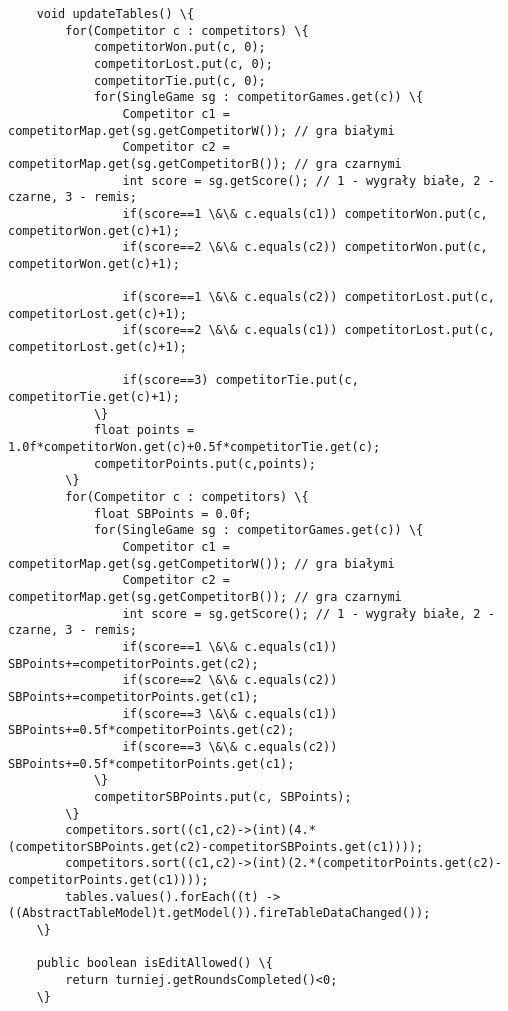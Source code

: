 \begin{verbatim}
	void updateTables() \{
		for(Competitor c : competitors) \{
			competitorWon.put(c, 0);
			competitorLost.put(c, 0);
			competitorTie.put(c, 0);
			for(SingleGame sg : competitorGames.get(c)) \{
				Competitor c1 = competitorMap.get(sg.getCompetitorW()); // gra białymi
				Competitor c2 = competitorMap.get(sg.getCompetitorB()); // gra czarnymi
				int score = sg.getScore(); // 1 - wygrały białe, 2 - czarne, 3 - remis;
				if(score==1 \&\& c.equals(c1)) competitorWon.put(c, competitorWon.get(c)+1);
				if(score==2 \&\& c.equals(c2)) competitorWon.put(c, competitorWon.get(c)+1);
				
				if(score==1 \&\& c.equals(c2)) competitorLost.put(c, competitorLost.get(c)+1);
				if(score==2 \&\& c.equals(c1)) competitorLost.put(c, competitorLost.get(c)+1);
				
				if(score==3) competitorTie.put(c, competitorTie.get(c)+1);
			\}
			float points = 1.0f*competitorWon.get(c)+0.5f*competitorTie.get(c);
			competitorPoints.put(c,points);
		\}
		for(Competitor c : competitors) \{
			float SBPoints = 0.0f;
			for(SingleGame sg : competitorGames.get(c)) \{
				Competitor c1 = competitorMap.get(sg.getCompetitorW()); // gra białymi
				Competitor c2 = competitorMap.get(sg.getCompetitorB()); // gra czarnymi
				int score = sg.getScore(); // 1 - wygrały białe, 2 - czarne, 3 - remis;
				if(score==1 \&\& c.equals(c1)) SBPoints+=competitorPoints.get(c2);
				if(score==2 \&\& c.equals(c2)) SBPoints+=competitorPoints.get(c1);
				if(score==3 \&\& c.equals(c1)) SBPoints+=0.5f*competitorPoints.get(c2);
				if(score==3 \&\& c.equals(c2)) SBPoints+=0.5f*competitorPoints.get(c1);
			\}
			competitorSBPoints.put(c, SBPoints);
		\}
		competitors.sort((c1,c2)->(int)(4.*(competitorSBPoints.get(c2)-competitorSBPoints.get(c1))));
		competitors.sort((c1,c2)->(int)(2.*(competitorPoints.get(c2)-competitorPoints.get(c1))));
		tables.values().forEach((t) -> ((AbstractTableModel)t.getModel()).fireTableDataChanged());
	\}
	
	public boolean isEditAllowed() \{
		return turniej.getRoundsCompleted()<0;
	\}
	
\end{verbatim}

